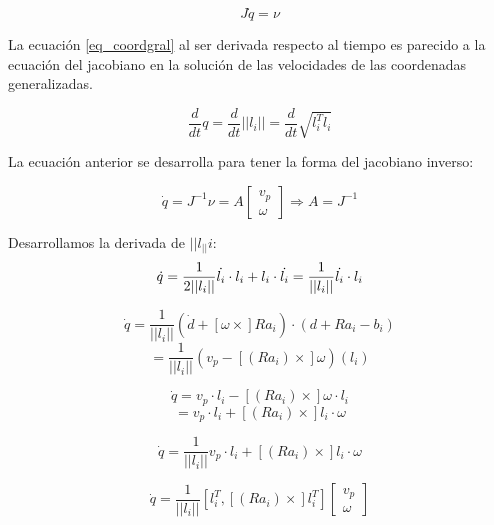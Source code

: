 \begin{equation} \label{equgral_q}
J\dot{q}=\nu
\end{equation}

La ecuación \ref{eq_coordgral} al ser derivada respecto al 
tiempo es parecido a la ecuación del jacobiano en la 
solución de las velocidades de las coordenadas 
generalizadas.

\begin{equation}
\frac{d}{dt}q = \frac{d}{dt}||l_i|| = \frac{d}{dt}\sqrt{l_i^Tl_i} 
\end{equation}

La ecuación anterior se desarrolla para tener la forma del 
jacobiano inverso:

\begin{equation}
\dot{q}=J^{-1} \nu = A \begin{bmatrix}
v_p\\
\omega
\end{bmatrix} \Rightarrow A = J^{-1}
\end{equation}

Desarrollamos la derivada de $||l_||i$:
\begin{equation}
\dot{q} = \frac{1}{2||l_i||} \dot{l_i} \cdot l_i + l_i \cdot \dot{l_i} = \frac{1}{||l_i||} \dot{l_i} \cdot l_i \\ \bigskip
\end{equation}

\begin{equation}
\dot{q}=\frac{1}{||l_i||}(\dot{d} + [\omega \times] Ra_i)\cdot(d + Ra_i -b_i) 
\end{equation}
\begin{equation*}
= \frac{1}{||l_i||}(v_p - [(Ra_i)\times]\omega)(l_i)
\end{equation*}

\begin{equation}
\dot{q} = v_p \cdot l_i - [(Ra_i)\times]\omega \cdot l_i 
\end{equation}
\begin{equation*}
= v_p \cdot l_i + [(Ra_i)\times]l_i \cdot \omega
\end{equation*}

\begin{equation}
\dot{q} = \frac{1}{||l_i||} v_p \cdot l_i + [(Ra_i)\times]l_i \cdot \omega
\end{equation}

\begin{equation} \label{jac_inv}
\dot{q} = \frac{1}{||l_i||} [l_i^T , [(Ra_i)\times]l_i^T] \begin{bmatrix}
v_p\\
\omega
\end{bmatrix}
\end{equation}


